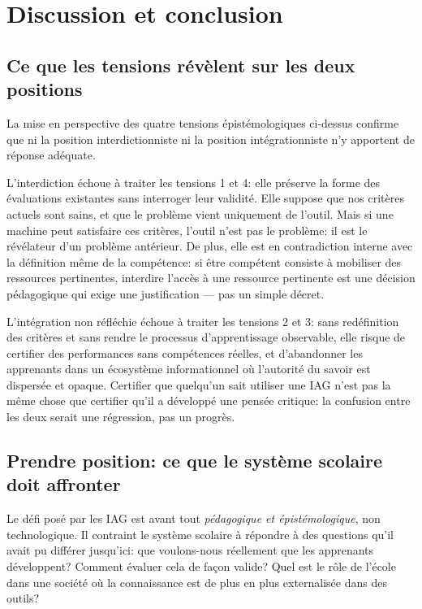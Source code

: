 \section{Discussion et conclusion}\label{sec:discussion}

\subsection*{Ce que les tensions révèlent sur les deux positions}

La mise en perspective des quatre tensions épistémologiques ci-dessus confirme que ni la position interdictionniste ni la position intégrationniste n'y apportent de réponse adéquate.

L'interdiction échoue à traiter les tensions 1 et 4: elle préserve la forme des évaluations existantes sans interroger leur validité. 
Elle suppose que nos critères actuels sont sains, et que le problème vient uniquement de l'outil. 
Mais si une machine peut satisfaire ces critères, l'outil n'est pas le problème: il est le révélateur d'un problème antérieur. 
De plus, elle est en contradiction interne avec la définition même de la compétence: si être compétent consiste à mobiliser des ressources pertinentes, interdire l'accès à une ressource pertinente est une décision pédagogique qui exige une justification --- pas un simple décret.

L'intégration non réfléchie échoue à traiter les tensions 2 et 3: sans redéfinition des critères et sans rendre le processus d'apprentissage observable, elle risque de certifier des performances sans compétences réelles, et d'abandonner les apprenants dans un écosystème informationnel où l'autorité du savoir est dispersée et opaque. 
Certifier que quelqu'un sait utiliser une IAG n'est pas la même chose que certifier qu'il a développé une pensée critique: la confusion entre les deux serait une régression, pas un progrès.

\subsection*{Prendre position: ce que le système scolaire doit affronter}

Le défi posé par les IAG est avant tout \emph{pédagogique et épistémologique}, non technologique. 
Il contraint le système scolaire à répondre à des questions qu'il avait pu différer jusqu'ici: que voulons-nous réellement que les apprenants développent?
Comment évaluer cela de façon valide? 
Quel est le rôle de l'école dans une société où la connaissance est de plus en plus externalisée dans des outils?


